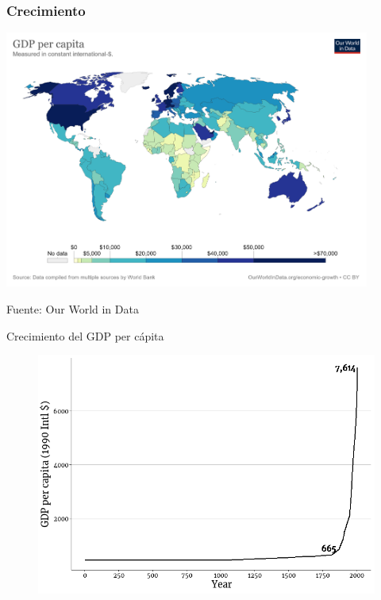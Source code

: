 \documentclass{beamer}
\begin{document}
\begin{frame}
\frametitle{Crecimiento}
\begin{center}
    \href{https://ourworldindata.org/grapher/gdp-per-capita-worldbank} {\includegraphics[width=0.9\textwidth]{Figures/gdppc2020.png}}
\end{center}
Fuente: Our World in Data
\end{frame}

\begin{frame}{Crecimiento del GDP per cápita}
    \begin{figure} [H]   \includegraphics[scale=0.5]{Figures/C17.1.png}
\end{figure}
\end{frame}
\end{document}
